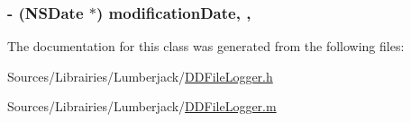 \hypertarget{interface_d_d_log_file_info_a2e22c1315c04069c65ad59a083e6e8c8}{
\subsubsection[{modification\-Date}]{\setlength{\rightskip}{0pt plus 5cm}-\/ (N\-S\-Date $\ast$) modification\-Date\hspace{0.3cm}{\ttfamily [read]}, {\ttfamily [nonatomic]}, {\ttfamily [strong]}}}\label{interface_d_d_log_file_info_a2e22c1315c04069c65ad59a083e6e8c8}


The documentation for this class was generated from the following files\-:\begin{DoxyCompactItemize}
\item 
Sources/\-Librairies/\-Lumberjack/\hyperlink{_d_d_file_logger_8h}{D\-D\-File\-Logger.\-h}\item 
Sources/\-Librairies/\-Lumberjack/\hyperlink{_d_d_file_logger_8m}{D\-D\-File\-Logger.\-m}\end{DoxyCompactItemize}
